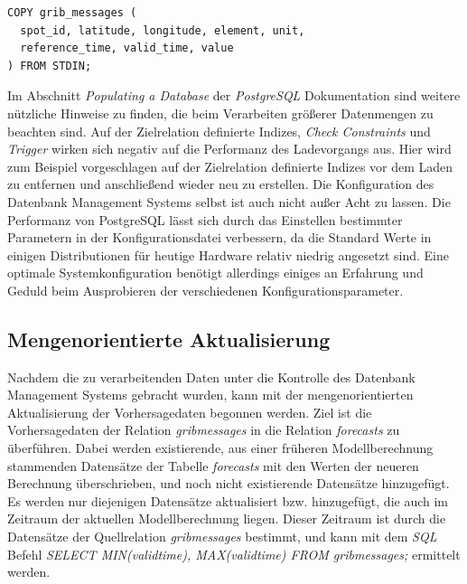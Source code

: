 \begin{lstlisting}[captionpos=b, caption=Befehl zum Import von Datensätzen in \textit{PostgreSQL}, label=lst:copy]
COPY grib_messages (
  spot_id, latitude, longitude, element, unit, 
  reference_time, valid_time, value
) FROM STDIN;
\end{lstlisting}

Im Abschnitt \textit{Populating a Database} \cite{postgresql:populate}
der \textit{PostgreSQL} Dokumentation sind weitere nützliche Hinweise
zu finden, die beim Verarbeiten größerer Datenmengen zu beachten
sind. Auf der Zielrelation definierte Indizes, \textit{Check
  Constraints} und \textit{Trigger} wirken sich negativ auf die
Performanz des Ladevorgangs aus. Hier wird zum Beispiel vorgeschlagen
auf der Zielrelation definierte Indizes vor dem Laden zu entfernen und
anschließend wieder neu zu erstellen. Die Konfiguration des Datenbank
Management Systems selbst ist auch nicht außer Acht zu lassen. Die
Performanz von PostgreSQL lässt sich durch das Einstellen bestimmter
Parametern in der Konfigurationsdatei verbessern, da die Standard
Werte in einigen Distributionen für heutige Hardware relativ niedrig
angesetzt sind. Eine optimale Systemkonfiguration benötigt allerdings
einiges an Erfahrung und Geduld beim Ausprobieren der verschiedenen
Konfigurationsparameter.

\subsection{Mengenorientierte Aktualisierung}
Nachdem die zu verarbeitenden Daten unter die Kontrolle des Datenbank
Management Systems gebracht wurden, kann mit der mengenorientierten
Aktualisierung der Vorhersagedaten begonnen werden. Ziel ist die
Vorhersagedaten der Relation \textit{grib\textunderscore messages} in
die Relation \textit{forecasts} zu überführen. Dabei werden
existierende, aus einer früheren Modellberechnung stammenden
Datensätze der Tabelle \textit{forecasts} mit den Werten der neueren
Berechnung überschrieben, und noch nicht existierende Datensätze
hinzugefügt. Es werden nur diejenigen Datensätze aktualisiert bzw.
hinzugefügt, die auch im Zeitraum der aktuellen Modellberechnung
liegen. Dieser Zeitraum ist durch die Datensätze der Quellrelation
\textit{grib\textunderscore messages} bestimmt, und kann mit dem
\textit{SQL} Befehl \textit{SELECT MIN(valid\textunderscore time),
  MAX(valid\textunderscore time) FROM grib\textunderscore messages;}
ermittelt werden. 

